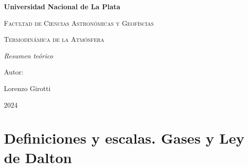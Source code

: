 \documentclass[openany]{book}
\begin{document}
\begin{titlepage}
	\centering
	{\bfseries\LARGE Universidad Nacional de La Plata \par}
	\vspace{1cm}
	{\scshape\Large Facultad de Ciencias Astronómicas y Geofíscias \par}
	\vspace{3cm}
	{\scshape\Huge Termodinámica de la Atmósfera \par}
	\vspace{3cm}
	{\itshape\Large Resumen teórico \par}
	\vfill
	{\Large Autor: \par}
	{\Large Lorenzo Girotti \par}
	\vfill
	{\Large 2024 \par}
\end{titlepage}

\chapter{Definiciones y escalas. Gases y Ley de Dalton}
\pagestyle{fancy}
\justify
\end{document}
